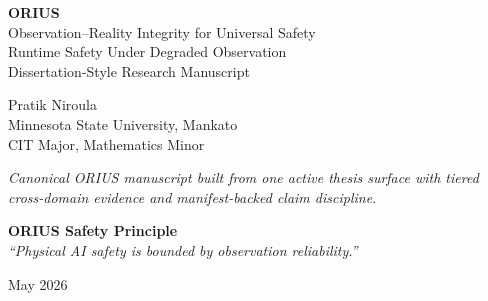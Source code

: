 \begin{titlepage}
\centering
\vspace*{2cm}

{\Huge\bfseries ORIUS\\[0.5cm]}
{\Large Observation--Reality Integrity for Universal Safety\\[1cm]}
{\large Runtime Safety Under Degraded Observation\\[0.3cm]}
{\large Dissertation-Style Research Manuscript\\[2cm]}

{\Large Pratik Niroula\\[0.5cm]}
{\large Minnesota State University, Mankato\\[0.3cm]}
{\large CIT Major, Mathematics Minor\\[2cm]}

\vfill

{\large\itshape
Canonical ORIUS manuscript built from one active thesis surface with tiered
cross-domain evidence and manifest-backed claim discipline.\\[1cm]}

\vspace{1cm}

{\large\bfseries ORIUS Safety Principle}\\[0.3cm]
{\large\itshape ``Physical AI safety is bounded by observation reliability.''}

\vfill

{\large May 2026}

\end{titlepage}
